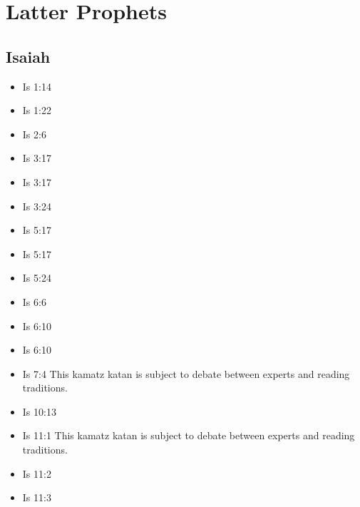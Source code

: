 \documentclass[14pt]{book}
\begin{document}
\section{Latter Prophets}
\subsection{Isaiah}
\begin{multicols}{2}\begin{itemize}

\item Is 1:14

\item Is 1:22

\item Is 2:6

\item Is 3:17

\item Is 3:17

\item Is 3:24

\item Is 5:17

\item Is 5:17

\item Is 5:24

\item Is 6:6

\item Is 6:10

\item Is 6:10

\item Is 7:4 This kamatz katan is subject to debate between experts and reading traditions.

\item Is 10:13

\item Is 11:1 This kamatz katan is subject to debate between experts and reading traditions.

\item Is 11:2

\item Is 11:3


\end{itemize}
\end{multicols}
\end{document}
